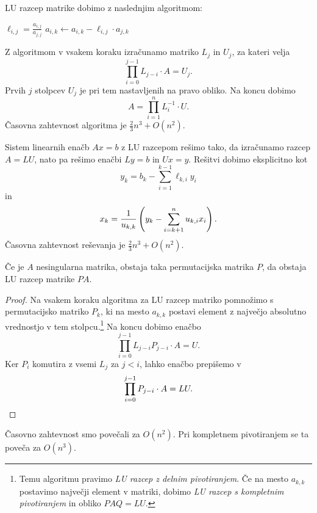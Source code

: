 \begin{opomba}
LU razcep matrike dobimo z naslednjim algoritmom:

\begin{algorithmic}[1]
    \State $\ell_{i,j} = \frac{a_{i,j}}{a_{j,j}}$
      \State $a_{i,k} \gets a_{i,k} - \ell_{i,j} \cdot a_{j,k}$
    \EndFor
  \EndFor
\EndFor
\end{algorithmic}

Z algoritmom v vsakem koraku izračunamo matriko $L_j$ in $U_j$, za
kateri velja
\[
\prod_{i=0}^{j-1} L_{j-i} \cdot A = U_j.
\]
Prvih $j$ stolpcev $U_j$ je pri tem nastavljenih na pravo obliko.
Na koncu dobimo
\[
A = \prod_{i=1}^n L_i^{-1} \cdot U.
\]
Časovna zahtevnost algoritma je $\frac{2}{3} n^3 + O(n^2)$.
\end{opomba}

\begin{opomba}
Sistem linearnih enačb $Ax = b$ z LU razcepom rešimo tako, da
izračunamo razcep $A = LU$, nato pa rešimo enačbi $Ly = b$ in
$Ux = y$. Rešitvi dobimo eksplicitno kot
\[
y_k = b_k - \sum_{i=1}^{k-1} \ell_{k,i} y_i
\]
in
\[
x_k = \frac{1}{u_{k,k}} \left(y_k - \sum_{i=k+1}^n u_{k,i} x_i\right).
\]
Časovna zahtevnost reševanja je $\frac{2}{3} n^3 + O(n^2)$.
\end{opomba}

\begin{izrek}
Če je $A$ nesingularna matrika, obstaja taka permutacijska matrika
$P$, da obstaja LU razcep matrike $PA$.
\end{izrek}

\begin{proof}
Na vsakem koraku algoritma za LU razcep matriko pomnožimo s
permutacijsko matriko $P_k$, ki na mesto $a_{k,k}$ postavi element
z največjo absolutno vrednostjo v tem stolpcu.\footnote{Temu
algoritmu pravimo \emph{LU razcep z delnim pivotiranjem}. Če na
mesto $a_{k,k}$ postavimo največji element v matriki, dobimo
\emph{LU razcep s kompletnim pivotiranjem} in obliko $PAQ = LU$.}
Na koncu dobimo enačbo
\[
\prod_{i=0}^{j-1} L_{j-i} P_{j-i} \cdot A = U.
\]
Ker $P_i$ komutira z vsemi $L_j$ za $j < i$, lahko enačbo prepišemo
v
\[
\prod_{i=0}^{j-1} P_{j-i} \cdot A = LU. \qedhere
\]
\end{proof}

\begin{opomba}
Časovno zahtevnost smo povečali za $O(n^2)$. Pri kompletnem
pivotiranjem se ta poveča za $O(n^3)$.
\end{opomba}

